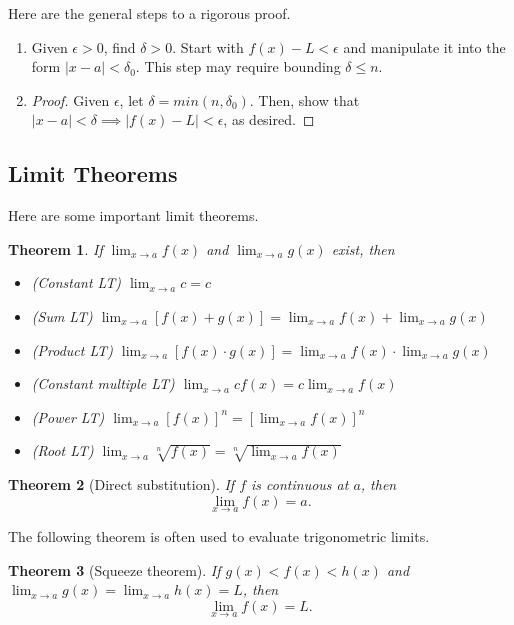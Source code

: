 \documentclass[11pt]{scrartcl}
\theoremstyle{plain}
\newtheorem{theorem}{Theorem}[section]
\theoremstyle{definition}
\theoremstyle{remark}
\begin{document}
Here are the general steps to a rigorous proof.

\begin{enumerate}
    \item Given $\epsilon>0$, find $\delta>0$. Start with $f(x)-L<\epsilon$ and manipulate
    it into the form $\lvert x-a \rvert<\delta_{0}$. This step may require bounding $\delta\leq n$.
    \item \begin{proof} 
        Given $\epsilon$, let $\delta=min(n,\delta_{0})$. Then, show that $\lvert x-a 
        \rvert<\delta\implies \lvert f(x)-L \rvert<\epsilon$, as desired. 
    \end{proof}
\end{enumerate}

\subsection{Limit Theorems}

Here are some important limit theorems.

\begin{theorem}
    If $\lim_{ x \to a }f(x)$ and $\lim_{ x \to a }g(x)$ exist, then
    \begin{itemize}
        \item (Constant LT) $\lim_{ x \to a }c=c$
        \item (Sum LT) $\lim_{ x \to a }[f(x)+g(x)]=\lim_{ x \to a }f(x)+\lim_{ x \to a }g(x)$
        \item (Product LT) $\lim_{ x \to a }[f(x)\cdot g(x)]=\lim_{ x \to a }f(x)\cdot 
        \lim_{ x \to a }g(x)$
        \item (Constant multiple LT) $\lim_{ x \to a }cf(x)=c\lim_{ x \to a }f(x)$
        \item (Power LT) $\lim_{ x \to a }[f(x)]^n=[\lim_{ x \to a }f(x)]^n$
        \item (Root LT) $\lim_{ x \to a }\sqrt[n]{ f(x) }=\sqrt[n]{ \lim_{ x \to a }f(x) }$
    \end{itemize}
\end{theorem}

\begin{theorem}[Direct substitution]
    If $f$ is continuous at $a$, then \[ \lim_{ x \to a } f(x)=a. \]
\end{theorem}

The following theorem is often used to evaluate trigonometric limits.

\begin{theorem}[Squeeze theorem]
    If $g(x)<f(x)<h(x)$ and $\lim_{ x \to a }g(x)=\lim_{ x \to a }h(x)=L$, then 
    \[ \lim_{ x \to a } f(x)=L. \]
\end{theorem}
\end{document}
